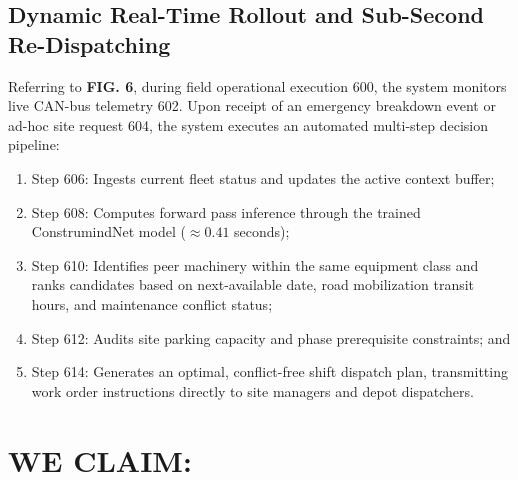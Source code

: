 \documentclass[11pt,a4paper]{article}
\begin{document}
\subsection{Dynamic Real-Time Rollout and Sub-Second Re-Dispatching}
\noindent Referring to \textbf{FIG. 6}, during field operational execution 600, the system monitors live CAN-bus telemetry 602. Upon receipt of an emergency breakdown event or ad-hoc site request 604, the system executes an automated multi-step decision pipeline:
\begin{enumerate}
    \item Step 606: Ingests current fleet status and updates the active context buffer;
    \item Step 608: Computes forward pass inference through the trained ConstrumindNet model ($\approx 0.41$ seconds);
    \item Step 610: Identifies peer machinery within the same equipment class and ranks candidates based on next-available date, road mobilization transit hours, and maintenance conflict status;
    \item Step 612: Audits site parking capacity and phase prerequisite constraints; and
    \item Step 614: Generates an optimal, conflict-free shift dispatch plan, transmitting work order instructions directly to site managers and depot dispatchers.
\end{enumerate}

\newpage

\section*{WE CLAIM:}
\end{document}
